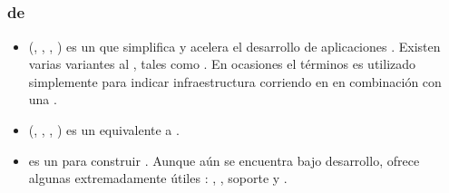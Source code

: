 \subsection{\fullstackAS \javaScriptNAME \frameworksPC}
\label{cap:estadoArte:section:fullstack_javaScript_framework}

\subsubsection{\stackAS de \javaScriptNAME \frameworksPC}
	\begin{itemize}
		\item
			\textbf{\meanstackNAME} (\mongodbNAME, \expressjsNAME, \angularjsNAME, \nodejsNAME) es un \fullstackAS \javaScriptNAME \frameworkPC que simplifica y acelera el desarrollo de aplicaciones \webINT \cite{online_mean_io}. Existen varias variantes al \stackAS \meanstackNAME, tales como \meenstackNAME. En ocasiones el términos es utilizado simplemente para indicar infraestructura corriendo en \nodejsNAME en combinación con una \dataBaseDB \nosqlNAME.
		\item
			\textbf{\meenstackNAME} \cite{online_meen_github}(\mongodbNAME, \emberjsNAME, \expressjsNAME, \nodejsNAME) es un \fullstackAS \javaScriptNAME \frameworkPC equivalente a \meanstackNAMEref.
		\item
			\textbf{\socketStreamNAME} es un \fullstackAS \javaScriptNAME para construir \singlePageAppINT. Aunque aún se encuentra bajo desarrollo, ofrece algunas extremadamente útiles \featuresCPT: \websocketsINT, \renderingCPT \clientSideAS, soporte \httpNAME y \authenticationINT \builtINPL. \cite{online_socketstream_official_org}


\end{itemize}
